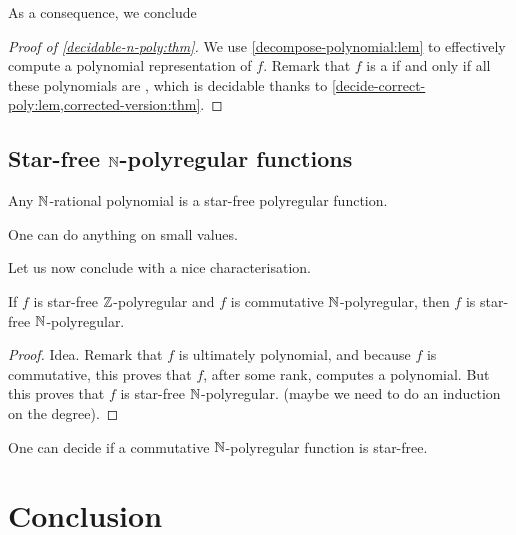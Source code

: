 \documentclass[a4paper,11pt]{article}
\begin{document}
As a consequence, we conclude 
\begin{proof}[Proof of \cref{decidable-n-poly:thm}]
    We use \cref{decompose-polynomial:lem}
    to effectively compute
    a polynomial representation of $f$. Remark that
    $f$ is a  if and only if
    all these polynomials are ,
    which is decidable thanks to
    \cref{decide-correct-poly:lem,corrected-version:thm}.
\end{proof}

\subsection{Star-free $\mathbb{N}$-polyregular functions}

\begin{definition}
\end{definition}

\begin{fact}
    Any $\mathbb{N}$-rational polynomial is a star-free polyregular function.
\end{fact}

\begin{fact}
    One can do anything on small values.
\end{fact}

Let us now conclude with a nice characterisation.
\begin{theorem}
    If
    $f$ is star-free $\mathbb{Z}$-polyregular
    and $f$ is commutative $\mathbb{N}$-polyregular,
    then $f$ is star-free $\mathbb{N}$-polyregular.
\end{theorem}
\begin{proof}
    Idea. 
    Remark that $f$ is ultimately polynomial, and because $f$ 
    is commutative, this proves that $f$, after some rank,
    computes a polynomial. But this proves that $f$ is star-free
    $\mathbb{N}$-polyregular.
    (maybe we need to do an induction on the degree).
\end{proof}

\begin{corollary}
    One can decide if a commutative $\mathbb{N}$-polyregular function 
    is star-free.
\end{corollary}

\section{Conclusion}
\label{sec:ccl}
\end{document}
